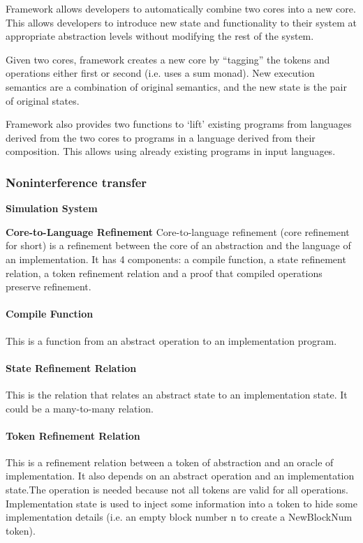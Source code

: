 \documentclass[onecolumn]{paper}
\begin{document}
		Framework allows developers to automatically combine two cores into a new core. This allows developers to introduce new state and functionality to their system at appropriate abstraction levels without modifying the rest of the system.
		
		Given two cores, framework creates a new core by “tagging” the tokens and operations either first or second (i.e. uses a sum monad). New execution semantics are a combination of original semantics, and the new state is the pair of original states. 
		
		Framework also provides two functions to ‘lift’ existing programs from languages derived from the two cores to programs in a language derived from their composition. This allows using already existing programs in input languages.		
		
		\subsubsection{Noninterference transfer}
		
		
		
		{\bf Simulation System}
		
		
		{\bf Core-to-Language Refinement}
		Core-to-language refinement (core refinement for short) is a refinement between the core of an abstraction and the language of an implementation. It has 4 components: a compile function, a state refinement relation, a token refinement relation and a proof that compiled operations preserve refinement. 
		
		\paragraph{Compile Function}
		This is a function from an abstract operation to an implementation program.
		
		\paragraph{State Refinement Relation}
		This is the relation that relates an abstract state to an implementation state. It could be a many-to-many relation.
		
		\paragraph{Token Refinement Relation}
		This is a refinement relation between a token of abstraction and an oracle of implementation. It also depends on an abstract operation and an implementation state.The operation is needed because not all tokens are valid for all operations. Implementation state is used to inject some information into a token to hide some implementation details (i.e. an empty block number n to create a NewBlockNum token). 
		
\end{document}

